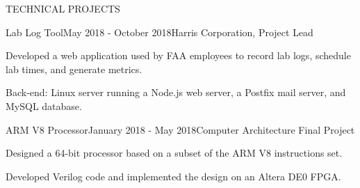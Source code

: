 \documentclass{resume} %
\begin{document}
\begin{rSection}{TECHNICAL PROJECTS}
  \begin{rSubsection}{Lab Log Tool}{May 2018 - October 2018}{Harris Corporation, Project Lead}{}
  \item Developed a web application used by FAA employees to record lab logs, schedule lab times, and generate metrics.
  \item Back-end: Linux server running a Node.js web server, a Postfix mail server, and MySQL database.
  \end{rSubsection}


  \begin{rSubsection}{ARM V8 Processor}{January 2018 - May 2018}{Computer
    Architecture Final Project}{}
  \item Designed a 64-bit processor based on a subset of the ARM V8 instructions set.
  \item Developed Verilog code and implemented the design on an Altera DE0 FPGA.
  \end{rSubsection}










\end{rSection}
\end{document}
